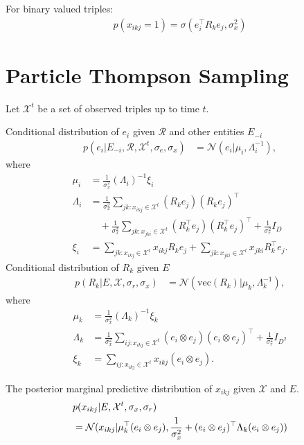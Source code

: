 \documentclass{article}
\begin{document}
For binary valued triples:
\begin{align}
p(x_{ikj}=1) = \sigma(e_i^{\top} R_k e_j, \sigma_x^2)
\end{align}


\section{Particle Thompson Sampling}
Let $\mathcal{X}^{t}$ be a set of observed triples up to time $t$.

Conditional distribution of $e_i$ given $\mathcal{R}$ and other entities $E_{-i}$
\begin{align} \label{eqn:sample_e}
p(e_i |E_{-i}, \mathcal{R}, \mathcal{X}^{t}, \sigma_e, \sigma_x) &= \mathcal{N}(e_i | \mu_i, \Lambda_i^{-1}),
\end{align}
where
\begin{align*}
\mu_i &= \frac{1}{\sigma_x^2}(\Lambda_i)^{-1}\xi_i \\
\Lambda_i &= \frac{1}{\sigma_x^2} \sum_{jk : x_{ikj} \in \mathcal{X}^{t}} (R_k e_j)(R_k e_j)^\top \\
&\quad+ \frac{1}{\sigma_x^2} \sum_{jk : x_{jki} \in \mathcal{X}^{t}} (R_k^\top e_j)(R_k^\top e_j)^\top+ \frac{1}{\sigma_e^2} {I}_D \\
\xi_i &= \sum_{jk : x_{ikj} \in \mathcal{X}^{t}}  x_{ikj} R_{k} e_{j} + \sum_{jk : x_{jki} \in \mathcal{X}^{t}} x_{jki} R_{k}^\top e_{j}.
\end{align*}
Conditional distribution of $R_k$ given $E$
\begin{align}
\label{eqn:sample_r}
p(R_k|E, \mathcal{X}, \sigma_r, \sigma_x)  &= \mathcal{N}(\text{vec}(R_k) | \mu_k, \Lambda_k^{-1}),
\end{align}
where
\begin{align*}
\mu_k &= \frac{1}{\sigma_x^2}(\Lambda_k)^{-1}\xi_k \\
\Lambda_k &= \frac{1}{\sigma_x^2} \sum_{ij:x_{ikj} \in \mathcal{X}^{t}} (e_i \otimes e_j)(e_i \otimes e_j)^\top + \frac{1}{\sigma_r^2} {I}_{D^2} \\
\xi_k &= \sum_{ij:x_{ikj} \in \mathcal{X}^{t}} x_{ikj} (e_{i} \otimes e_{j}).
\end{align*}

The posterior marginal predictive distribution of $x_{ikj}$ given $\mathcal{X}$ and $E$.
\begin{align}
\label{eqn:marginal_predict}
&p(x_{ikj}| E, \mathcal{X}^{t}, \sigma_x, \sigma_r) \\
&= \mathcal{N}(x_{ikj}| \mu_k ^\top (e_i \otimes e_j), \frac{1}{\sigma_x^2} +  (e_i \otimes e_j)^\top \Lambda_k (e_i \otimes e_j)) \notag
\end{align}
\end{document}

